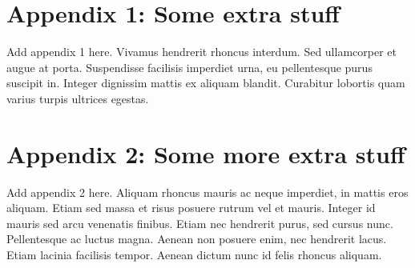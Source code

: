 \documentclass[11pt,letterpaper,]{article}
\begin{document}
\section*{Appendix 1: Some extra
stuff}\label{appendix-1-some-extra-stuff}

Add appendix 1 here. Vivamus hendrerit rhoncus interdum. Sed ullamcorper
et augue at porta. Suspendisse facilisis imperdiet urna, eu pellentesque
purus suscipit in. Integer dignissim mattis ex aliquam blandit.
Curabitur lobortis quam varius turpis ultrices egestas.

\section*{Appendix 2: Some more extra
stuff}\label{appendix-2-some-more-extra-stuff}

Add appendix 2 here. Aliquam rhoncus mauris ac neque imperdiet, in
mattis eros aliquam. Etiam sed massa et risus posuere rutrum vel et
mauris. Integer id mauris sed arcu venenatis finibus. Etiam nec
hendrerit purus, sed cursus nunc. Pellentesque ac luctus magna. Aenean
non posuere enim, nec hendrerit lacus. Etiam lacinia facilisis tempor.
Aenean dictum nunc id felis rhoncus aliquam.

\footnotesize


\printbibliography[title=References]


\end{document}
